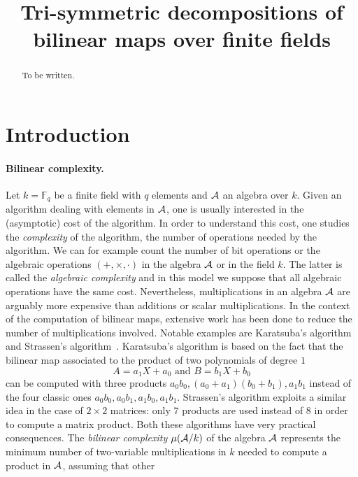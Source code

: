\documentclass[a4paper,11pt]{article}
\title{Tri-symmetric decompositions of bilinear maps over finite fields}
\author{}
\begin{document}
\maketitle

\begin{abstract}
  To be written.
\end{abstract}



\section{Introduction}
\label{sec:intro}

\paragraph{Bilinear complexity.} Let $k=\mathbb{F}_{q}$ be a finite field with
$q$ elements and $\mathcal{A}$
an algebra over $k$. Given an algorithm dealing with elements in $\mathcal{A}$, one is
usually interested in the (asymptotic) cost of the algorithm. In order to
understand this cost, one studies the \emph{complexity} of the algorithm, \ie
the number of operations needed by the algorithm. We can for example count the number
of bit operations or the algebraic operations $(+, \times, \cdot)$ in the algebra
$\mathcal{A}$ or in the field $k$. The latter is called the \emph{algebraic complexity}
and in this model we suppose that all algebraic operations have the same cost.
Nevertheless, multiplications in an algebra $\mathcal{A}$ are arguably more expensive than
additions or scalar multiplications. In the context of the computation of
bilinear maps, extensive work has been done to reduce the number of
multiplications involved. Notable examples are Karatsuba's
algorithm~\cite{Karatsuba63} and
Strassen's algorithm~\cite{Strassen69}. Karatsuba's algorithm is
based on the fact that the bilinear map associated to the product of two
polynomials of degree $1$
\[
  A = a_1 X + a_0\text{ and }B = b_1 X + b_0
\]
can be computed with three products $a_0b_0, (a_0+a_1)(b_0+b_1), a_1b_1$ instead
of the four classic ones $a_0b_0, a_0b_1, a_1b_0, a_1b_1$. Strassen's algorithm
exploits a similar idea in the case of $2\times2$ matrices: only $7$ products
are used instead of $8$ in order to compute a matrix product. Both these
algorithms have very practical consequences. The \emph{bilinear complexity}
$\mu(\mathcal{A}/k)$ of the algebra $\mathcal{A}$ represents the minimum number of two-variable
multiplications in $k$ needed to compute a product in $\mathcal{A}$, assuming that other
\end{document}
